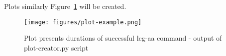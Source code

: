 \documentclass[a4paper, 11pt]{article} %
\begin{document}
Plots similarly Figure~\ref{img:plot-example} will be created.

\begin{figure}[H]
  \centering
    \texttt{[image: figures/plot-example.png]}
    \caption{Plot presents durations of successful lcg-aa command - output of plot-creator.py script}
    \label{img:plot-example}
\end{figure}







\end{document}
